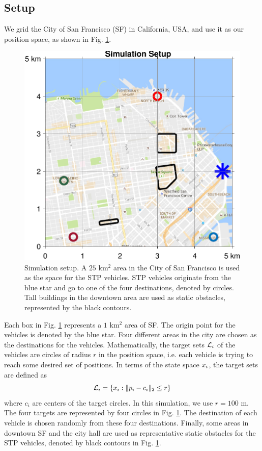 \subsection{Setup \label{sec:city_simSetup}}
We grid the City of San Francisco (SF) in California, USA, and use it as our position space, as shown in Fig. \ref{fig:sf_setup}. 
\begin{figure}
  \centering
  \includegraphics[width=\columnwidth]{figs/sf_setup}
  \caption{Simulation setup. A $25$ km$^2$ area in the City of San Francisco is used as the space for the STP vehicles. STP vehicles originate from the blue star and go to one of the four destinations, denoted by circles. Tall buildings in the downtown area are used as static obstacles, represented by the black contours.}
  \label{fig:sf_setup}
\end{figure}
Each box in Fig. \ref{fig:sf_setup} represents a $1$ km$^2$ area of SF. The origin point for the vehicles is denoted by the blue star. Four different areas in the city are chosen as the destinations for the vehicles. Mathematically, the target sets $\mathcal{L}_i$ of the vehicles are circles of radius $r$ in the position space, i.e. each vehicle is trying to reach some desired set of positions. In terms of the state space $x_i$, the target sets are defined as
\begin{equation}
\label{eq:target_sim}
\mathcal{L}_i = \{x_i: \|p_i - c_i\|_2 \le r\}
\end{equation}
\noindent where $c_i$ are centers of the target circles. In this simulation, we use $r = 100$ m. The four targets are represented by four circles in Fig. \ref{fig:sf_setup}. The destination of each vehicle is chosen randomly from these four destinations. Finally, some areas in downtown SF and the city hall are used as representative static obstacles for the STP vehicles, denoted by black contours in Fig. \ref{fig:sf_setup}.

